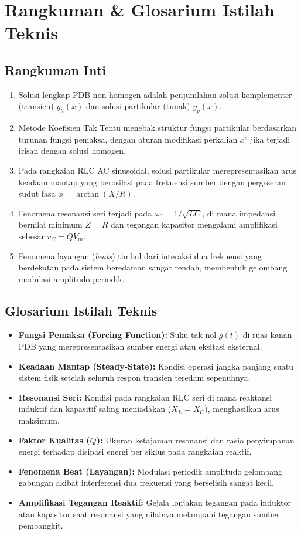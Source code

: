 \documentclass[11pt,a4paper]{article}
\theoremstyle{definition}
\begin{document}
\section{Rangkuman \& Glosarium Istilah Teknis}

\subsection{Rangkuman Inti}
\begin{enumerate}[leftmargin=*]
    \item Solusi lengkap PDB non-homogen adalah penjumlahan solusi komplementer (transien) $y_h(x)$ dan solusi partikular (tunak) $y_p(x)$.
    \item Metode Koefisien Tak Tentu menebak struktur fungsi partikular berdasarkan turunan fungsi pemaksa, dengan aturan modifikasi perkalian $x^s$ jika terjadi irisan dengan solusi homogen.
    \item Pada rangkaian RLC AC sinusoidal, solusi partikular merepresentasikan arus keadaan mantap yang berosilasi pada frekuensi sumber dengan pergeseran sudut fasa $\phi = \arctan(X/R)$.
    \item Fenomena resonansi seri terjadi pada $\omega_0 = 1/\sqrt{LC}$, di mana impedansi bernilai minimum $Z = R$ dan tegangan kapasitor mengalami amplifikasi sebesar $v_C = Q V_m$.
    \item Fenomena layangan (\textit{beats}) timbul dari interaksi dua frekuensi yang berdekatan pada sistem beredaman sangat rendah, membentuk gelombang modulasi amplitudo periodik.
\end{enumerate}

\subsection{Glosarium Istilah Teknis}
\begin{itemize}[leftmargin=*]
    \item \textbf{Fungsi Pemaksa (Forcing Function):} Suku tak nol $g(t)$ di ruas kanan PDB yang merepresentasikan sumber energi atau eksitasi eksternal.
    \item \textbf{Keadaan Mantap (Steady-State):} Kondisi operasi jangka panjang suatu sistem fisik setelah seluruh respon transien teredam sepenuhnya.
    \item \textbf{Resonansi Seri:} Kondisi pada rangkaian RLC seri di mana reaktansi induktif dan kapasitif saling meniadakan ($X_L = X_C$), menghasilkan arus maksimum.
    \item \textbf{Faktor Kualitas ($Q$):} Ukuran ketajaman resonansi dan rasio penyimpanan energi terhadap disipasi energi per siklus pada rangkaian reaktif.
    \item \textbf{Fenomena Beat (Layangan):} Modulasi periodik amplitudo gelombang gabungan akibat interferensi dua frekuensi yang berselisih sangat kecil.
    \item \textbf{Amplifikasi Tegangan Reaktif:} Gejala lonjakan tegangan pada induktor atau kapasitor saat resonansi yang nilainya melampaui tegangan sumber pembangkit.
\end{itemize}
\end{document}
